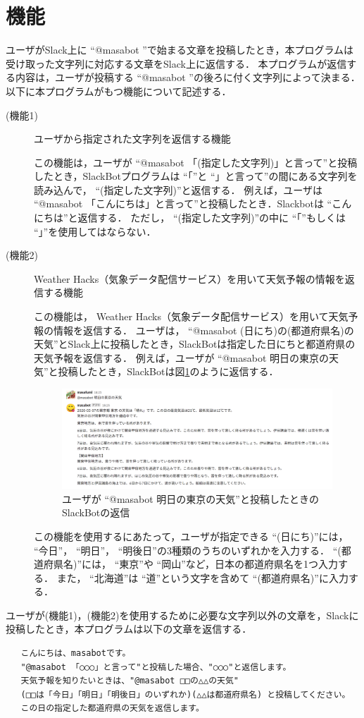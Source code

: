 \documentclass[12pt]{jsarticle}
\begin{document}
\section{機能}
ユーザがSlack上に ``@masabot ''で始まる文章を投稿したとき，本プログラムは受け取った文字列に対応する文章をSlack上に返信する．
本プログラムが返信する内容は，ユーザが投稿する ``@masabot ''の後ろに付く文字列によって決まる．
以下に本プログラムがもつ機能について記述する．
\begin{description}
\item[(機能1)] ユーザから指定された文字列を返信する機能
  
  この機能は，ユーザが ``@masabot 「(指定した文字列)」と言って''と投稿したとき，SlackBotプログラムは ``「''と ``」と言って''の間にある文字列を読み込んで， ``(指定した文字列)''と返信する．
  例えば，ユーザは ``@masabot 「こんにちは」と言って''と投稿したとき．Slackbotは ``こんにちは''と返信する．
  ただし， ``(指定した文字列)''の中に ``「''もしくは ``」''を使用してはならない．

\item[(機能2)]\label{func2}  Weather Hacks（気象データ配信サービス）を用いて天気予報の情報を返信する機能

  この機能は， Weather Hacks（気象データ配信サービス）を用いて天気予報の情報を返信する．
  ユーザは， ``@masabot (日にち)の(都道府県名)の天気''とSlack上に投稿したとき，SlackBotは指定した日にちと都道府県の天気予報を返信する．
  例えば，ユーザが ``@masabot 明日の東京の天気''と投稿したとき，SlackBotは図\ref{fig:weather}のように返信する．
  \begin{figure}[t]
    \centering
    \includegraphics[width=1\textwidth]{figs/weather.png}
    \caption{ユーザが ``@masabot 明日の東京の天気''と投稿したときのSlackBotの返信}
    \label{fig:weather}
\end{figure}
この機能を使用するにあたって，ユーザが指定できる ``(日にち)''には， ``今日''， ``明日''， ``明後日''の3種類のうちのいずれかを入力する．
 ``(都道府県名)''には， ``東京''や ``岡山''など，日本の都道府県名を1つ入力する．
また， ``北海道''は ``道''という文字を含めて ``(都道府県名)''に入力する．
\end{description}
ユーザが(機能1)，(機能2)を使用するために必要な文字列以外の文章を，Slackに投稿したとき，本プログラムは以下の文章を返信する．
\begin{verbatim}
   こんにちは、masabotです。        
   "@masabot 「○○○」と言って"と投稿した場合、"○○○"と返信します。
   天気予報を知りたいときは、"@masabot □□の△△の天気" 
   (□□は「今日」「明日」「明後日」のいずれか)(△△は都道府県名) と投稿してください。
   この日の指定した都道府県の天気を返信します。
\end{verbatim}
\end{document}
